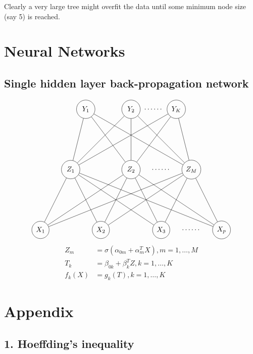 \documentclass{report}
\theoremstyle{nonumberplain}
\newcommand{\0}{\mathbf{0}}
\begin{document}
Clearly a very large tree might overfit
the data until some minimum node size (say 5) is reached.

\chapter{Neural Networks}
\section{Single hidden layer back-propagation network}
\[
\begin{tikzpicture}[scale=1.5]
\draw (0,0) node [draw,shape=circle] (x1) {$X_1$};
\draw (2,0) node [draw,shape=circle] (x2) {$X_2$};
\draw (4,0) node [draw,shape=circle] (x3) {$X_3$};
\draw (5,0) node (xdots) {$\cdots\cdots$};
\draw (6,0) node [draw,shape=circle] (xp) {$X_p$};
\draw (1,2) node [draw,shape=circle,minimum height=0.92cm] (z1) {$Z_1$};
\draw (3,2) node [draw,shape=circle,minimum height=0.92cm] (z2) {$Z_2$};
\draw (4,2) node (zdots) {$\cdots\cdots$};
\draw (5,2) node [draw,shape=circle,minimum height=0.92cm] (zm) {$Z_M$};
\draw (1.5,4) node [draw,shape=circle,minimum height=0.92cm] (y1) {$Y_1$};
\draw (3,4) node [draw,shape=circle,minimum height=0.92cm] (y2) {$Y_2$};
\draw (3.75,4) node (ydots) {$\cdots\cdots$};
\draw (4.5,4) node [draw,shape=circle,minimum height=0.92cm] (yk) {$Y_K$};
\draw 
(x1) -- node[pos=0.1,above]{} node[pos=0.85,above]{} (z1)
(x1) -- node[pos=0.1,below]{} node[pos=0.85,below]{}(z2)
(x1) -- node[pos=0.1,above]{} node[pos=0.85,above]{} (zm)
(x2) -- node[pos=0.05,anchor=90]{} node[pos=0.85,below]{} (z1)
(x2) -- node[pos=0.1,below]{} node[pos=0.85,below]{} (z2)
(x2) -- node[pos=0.1,above]{} node[pos=0.85,above]{} (zm)
(x3) -- node[pos=0.1,above]{} node[pos=0.85,above]{} (z1)
(x3) -- node[pos=0.1,above]{} node[pos=0.85,above]{} (z2)
(x3) -- node[pos=0.1,above]{} node[pos=0.85,above]{} (zm)
(xp) -- node[pos=0.1,above]{} node[pos=0.85,above]{} (z1)
(xp) -- node[pos=0.1,above]{} node[pos=0.85,above]{} (z2)
(xp) -- node[pos=0.1,above]{} node[pos=0.85,above]{} (zm)
(z1) -- node[pos=0.1,above]{} node[pos=0.85,above]{} (y1)
(z1) -- node[pos=0.1,above]{} node[pos=0.85,above]{} (y2)
(z1) -- node[pos=0.1,above]{} node[pos=0.85,above]{} (yk)
(z2) -- node[pos=0.1,above]{} node[pos=0.85,above]{} (y1)
(z2) -- node[pos=0.1,above]{} node[pos=0.85,above]{} (y2)
(z2) -- node[pos=0.1,above]{} node[pos=0.85,above]{} (yk)
(zm) -- node[pos=0.1,above]{} node[pos=0.85,above]{} (y1)
(zm) -- node[pos=0.1,above]{} node[pos=0.85,above]{} (y2)
(zm) -- node[pos=0.1,above]{} node[pos=0.85,above]{} (yk)
;
\end{tikzpicture}
\]
\[
\begin{aligned} Z_{m} &=\sigma\left(\alpha_{0 m}+\alpha_{m}^{T} X\right), m=1, \ldots, M \\ T_{k} &=\beta_{0 k}+\beta_{k}^{T} Z, k=1, \ldots, K \\ f_{k}(X) &=g_{k}(T), k=1, \ldots, K 
\end{aligned}
\]

\chapter*{Appendix}
\section*{1. Hoeffding's inequality} 
\end{document}
